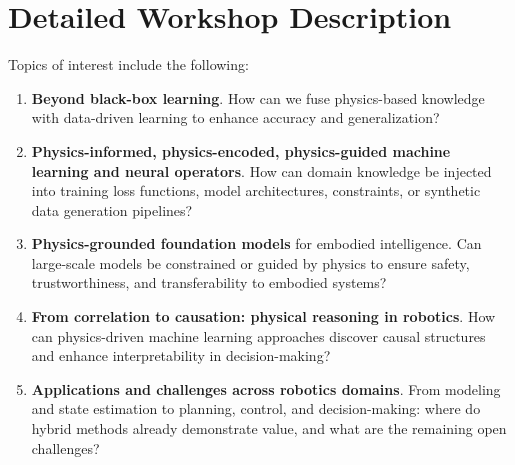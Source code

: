 \documentclass[12pt,a4paper]{article}
\newcommand{\revM}[1]{\textcolor{Red}{#1}}
\begin{document}
\section{Detailed Workshop Description} \label{sec_detailed_event_description}
%
%
Topics of interest include the following:
%
\begin{enumerate}
\item \textbf{Beyond black-box learning}. How can we fuse physics-based knowledge with data-driven learning to enhance accuracy and generalization?
\item \textbf{Physics-informed, physics-encoded, physics-guided machine learning and neural operators}. How can domain knowledge be injected into training loss functions, model architectures, constraints, or synthetic data generation pipelines?
\item \textbf{Physics-grounded foundation models} for embodied intelligence. Can large-scale models be constrained or guided by physics to ensure safety, trustworthiness, and transferability to embodied systems?
\item \textbf{From correlation to causation: physical reasoning in robotics}. How can physics-driven machine learning approaches discover causal structures and enhance interpretability in decision-making?
\item \textbf{Applications and challenges across robotics domains}. From modeling and state estimation to planning, control, and decision-making: where do hybrid methods already demonstrate value, and what are the remaining open challenges?
\end{enumerate}

\end{document}
